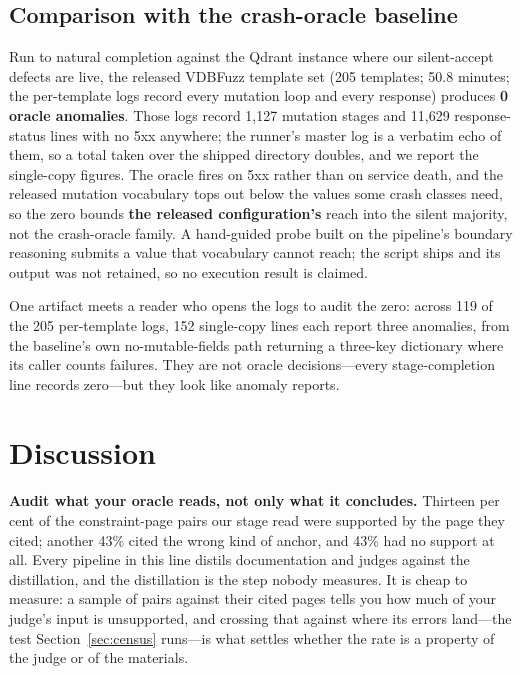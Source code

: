 \documentclass[acmsmall,screen,review,anonymous]{acmart}
\begin{document}
\subsection{Comparison with the crash-oracle baseline}
\label{sec:baseline}

Run to natural completion against the Qdrant instance where our silent-accept defects are live, the
released VDBFuzz template set (205 templates; 50.8 minutes; the per-template logs record every
mutation loop and every response) produces \textbf{0 oracle anomalies}. Those logs record 1,127
mutation stages and 11,629 response-status lines with no 5xx anywhere; the runner's master log is a
verbatim echo of them, so a total taken over the shipped directory doubles, and we report the
single-copy figures. The oracle fires on 5xx rather than on service death, and the released mutation
vocabulary tops out below the values some crash classes need, so the zero bounds \textbf{the released
configuration's} reach into the silent majority, not the crash-oracle family. A hand-guided probe
built on the pipeline's boundary reasoning submits a value that vocabulary cannot reach; the script
ships and its output was not retained, so no execution result is claimed.

One artifact meets a reader who opens the logs to audit the zero: across 119 of the 205 per-template
logs, 152 single-copy lines each report three anomalies, from the baseline's own no-mutable-fields
path returning a three-key dictionary where its caller counts failures. They are not oracle
decisions---every stage-completion line records zero---but they look like anomaly reports.

\section{Discussion}
\label{sec:discussion}

\textbf{Audit what your oracle reads, not only what it concludes.} Thirteen per cent of the
constraint-page pairs our stage read were supported by the page they cited; another 43\% cited the
wrong kind of anchor, and 43\% had no support at all. Every pipeline in this line distils
documentation and judges against the distillation, and the distillation is the step nobody measures.
It is cheap to measure: a sample of pairs against their cited pages tells you how much of your
judge's input is unsupported, and crossing that against where its errors land---the test
Section~\ref{sec:census} runs---is what settles whether the rate is a property of the judge or of
the materials.
\end{document}
